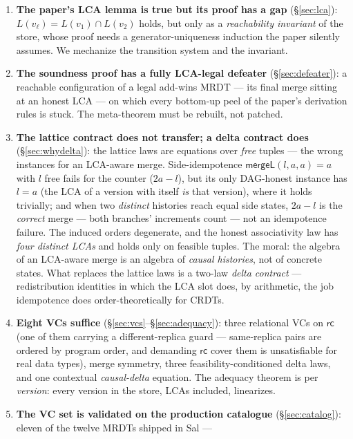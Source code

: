 \documentclass[11pt]{article}
\newcommand{\mergeL}{\mathsf{mergeL}}
\begin{document}
\begin{enumerate}[leftmargin=2em]
\item \textbf{The paper's LCA lemma is true but its proof has a gap}
  (\S\ref{sec:lca}): $L(v_\ell) = L(v_1) \cap L(v_2)$ holds, but only as a
  \emph{reachability invariant} of the store, whose proof needs a
  generator-uniqueness induction the paper silently assumes. We mechanize
  the transition system and the invariant.
\item \textbf{The soundness proof has a fully LCA-legal defeater}
  (\S\ref{sec:defeater}): a reachable configuration of a legal add-wins
  MRDT --- its final merge sitting at an honest LCA --- on which every
  bottom-up peel of the paper's derivation rules is stuck. The
  meta-theorem must be rebuilt, not patched.
\item \textbf{The lattice contract does not transfer; a delta contract does}
  (\S\ref{sec:whydelta}): the lattice laws are equations over \emph{free}
  tuples --- the wrong instances for an LCA-aware merge. Side-idempotence
  $\mergeL(l,a,a) = a$ with $l$ free fails for the counter ($2a-l$), but
  its only DAG-honest instance has $l = a$ (the LCA of a version with
  itself \emph{is} that version), where it holds trivially; and when two
  \emph{distinct} histories reach equal side states, $2a-l$ is the
  \emph{correct} merge --- both branches' increments count --- not an
  idempotence failure. The induced orders degenerate, and the honest
  associativity law has \emph{four distinct LCAs} and holds only on
  feasible tuples. The moral: the algebra of an LCA-aware merge is an
  algebra of \emph{causal histories}, not of concrete states. What
  replaces the lattice laws is a two-law \emph{delta contract} --- redistribution identities in which the LCA
  slot does, by arithmetic, the job idempotence does order-theoretically
  for CRDTs.
\item \textbf{Eight VCs suffice} (\S\ref{sec:vcs}--\S\ref{sec:adequacy}):
  three relational VCs on $\mathsf{rc}$ (one of them carrying a
  different-replica guard --- same-replica pairs are ordered by program
  order, and demanding $\mathsf{rc}$ cover them is unsatisfiable for
  real data types), merge symmetry, three
  feasibility-conditioned delta laws, and one contextual \emph{causal-delta}
  equation. The adequacy theorem is per \emph{version}: every version in
  the store, LCAs included, linearizes.
\item \textbf{The VC set is validated on the production catalogue}
  (\S\ref{sec:catalog}): eleven of the twelve MRDTs shipped in Sal ---

\end{enumerate}
\end{document}
